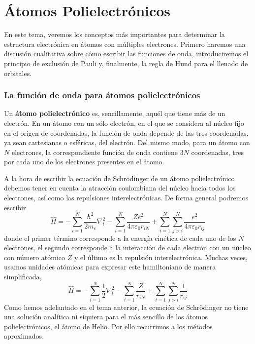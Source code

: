 \chapter{Átomos Polielectrónicos}
En este tema, veremos los conceptos más importantes para determinar 
la estructura electrónica en átomos con múltiples electrones. 
Primero haremos una discusión cualitativa sobre cómo escribir
las funciones de onda, introduciremos el
principio de  exclusión de Pauli y, finalmente, la regla de Hund para
el llenado de orbitales.

\subsection{La función de onda para átomos polielectrónicos}
Un \textbf{átomo polielectrónico} es, sencillamente, aquél que
tiene más de un electrón. En un átomo con un sólo electrón, en 
el que se considera al núcleo fijo en el origen de coordenadas, 
la función de onda depende de las tres coordenadas, ya
sean cartesianas o esféricas, del electrón. Del mismo modo, para
un átomo con $N$ electrones, la correspondiente función de onda
contiene $3N$ coordenadas, tres por cada uno 
de los electrones presentes en el átomo. 

A la hora de escribir la ecuación de Schrödinger de un átomo
polielectrónico debemos tener en cuenta la atracción coulombiana
del núcleo hacia todos los electrones, así como las repulsiones
interelectrónicas. De forma general podremos escribir
\begin{equation}
    \hat{H}=  
    -\sum_{i=1}^N\frac{\hbar^2}{2m_e}\nabla_i^2  
    -\sum_{i=1}^N\frac{Ze^2}{4\pi \varepsilon_0r_{iN}} 
    +\sum_{i=1}^N\sum_{j>i}^N\frac{e^2}{4\pi \varepsilon_0r_{ij}}
\end{equation}
donde el primer término corresponde a la energía cinética 
de cada uno de los $N$ electrones, el segundo corresponde
a la interacción de cada electrón con un núcleo con número
atómico $Z$ y el último es la repulsión interelectrónica. 
Muchas veces, usamos unidades atómicas para expresar este 
hamiltoniano de manera simplificada,
\begin{equation}
    \hat{H}=  
    -\sum_{i=1}^N\frac{1}{2}\nabla_i^2  
    -\sum_{i=1}^N\frac{Z}{r_{iN}} 
    +\sum_{i=1}^N\sum_{j>i}^N\frac{1}{r_{ij}}
    \label{eq:hamiltonian_poly}
\end{equation}
Como hemos adelantado en el tema anterior, la ecuación de
Schrödinger no tiene una solución analítica ni siquiera 
para el más sencillo de los átomos polielectrónicos, el 
átomo de Helio. Por ello recurrimos a los métodos aproximados.

